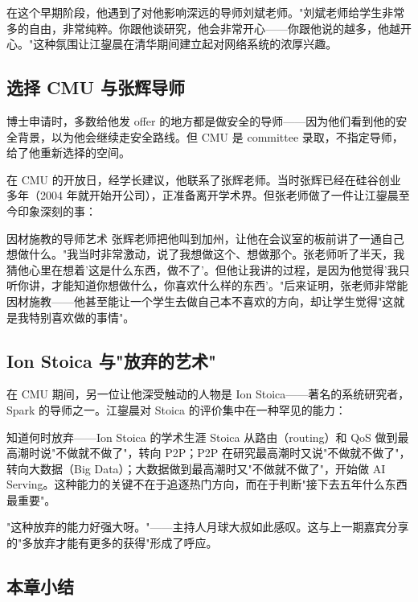 \documentclass[a4paper]{article}
\begin{document}
在这个早期阶段，他遇到了对他影响深远的导师刘斌老师。"刘斌老师给学生非常多的自由，非常纯粹。你跟他谈研究，他会非常开心——你跟他说的越多，他越开心。"这种氛围让江鋆晨在清华期间建立起对网络系统的浓厚兴趣。

\subsection{选择 CMU 与张辉导师}

博士申请时，多数给他发 offer 的地方都是做安全的导师——因为他们看到他的安全背景，以为他会继续走安全路线。但 CMU 是 committee 录取，不指定导师，给了他重新选择的空间。

在 CMU 的开放日，经学长建议，他联系了张辉老师。当时张辉已经在硅谷创业多年（2004 年就开始开公司），正准备离开学术界。但张老师做了一件让江鋆晨至今印象深刻的事：

\begin{knowledgebox}{因材施教的导师艺术}
张辉老师把他叫到加州，让他在会议室的板前讲了一通自己想做什么。"我当时非常激动，说了我想做这个、想做那个。张老师听了半天，我猜他心里在想着'这是什么东西，做不了'。但他让我讲的过程，是因为他觉得'我只听你讲，才能知道你想做什么，你喜欢什么样的东西'。"后来证明，张老师非常能因材施教——他甚至能让一个学生去做自己本不喜欢的方向，却让学生觉得"这就是我特别喜欢做的事情"。
\end{knowledgebox}

\subsection{Ion Stoica 与"放弃的艺术"}

在 CMU 期间，另一位让他深受触动的人物是 Ion Stoica——著名的系统研究者，Spark 的导师之一。江鋆晨对 Stoica 的评价集中在一种罕见的能力：

\begin{importantbox}{知道何时放弃——Ion Stoica 的学术生涯}
Stoica 从路由（routing）和 QoS 做到最高潮时说"不做就不做了"，转向 P2P；P2P 在研究最高潮时又说"不做就不做了"，转向大数据（Big Data）；大数据做到最高潮时又"不做就不做了"，开始做 AI Serving。这种能力的关键不在于追逐热门方向，而在于判断"接下去五年什么东西最重要"。

"这种放弃的能力好强大呀。"——主持人月球大叔如此感叹。这与上一期嘉宾分享的"多放弃才能有更多的获得"形成了呼应。
\end{importantbox}

\subsection{本章小结}
\end{document}
